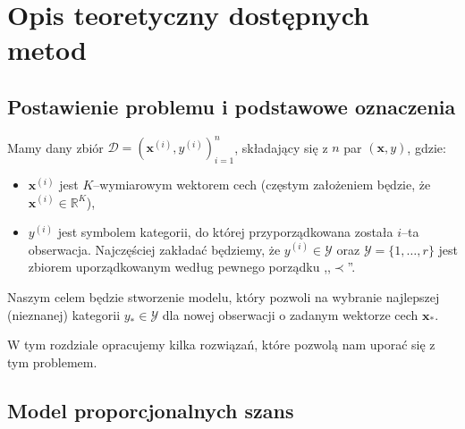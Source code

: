 \documentclass{mini}
\begin{document}
\chapter{Opis teoretyczny dostępnych metod}


\section{Postawienie problemu i podstawowe oznaczenia}

Mamy dany zbiór $\mathcal{D} = (\mathbf{x}^{(i)}, y^{(i)})_{i=1}^n$, składający się z $n$ par $(\mathbf{x}, y)$, gdzie:
\begin{itemize}
\item $\mathbf{x}^{(i)}$ jest $K$--wymiarowym wektorem cech (częstym założeniem będzie, że $\mathbf{x}^{(i)}\in \mathbb{R}^K$),  
\item $y^{(i)}$ jest symbolem kategorii, do której przyporządkowana została $i$--ta obserwacja. Najczęściej zakładać będziemy, że $y^{(i)}\in\mathcal{Y}$ oraz $\mathcal{Y} = \lbrace 1,\ldots ,r \rbrace$ jest zbiorem uporządkowanym według pewnego porządku ,,$\prec$''. 
\end{itemize}
Naszym celem będzie stworzenie modelu, który pozwoli na wybranie najlepszej (nieznanej) kategorii $y_{\ast}\in\mathcal{Y}$ dla nowej obserwacji o zadanym wektorze cech $\mathbf{x}_{\ast}$. 

W tym rozdziale opracujemy kilka rozwiązań, które pozwolą nam uporać się z tym problemem.

\section{Model proporcjonalnych szans}
\end{document}
